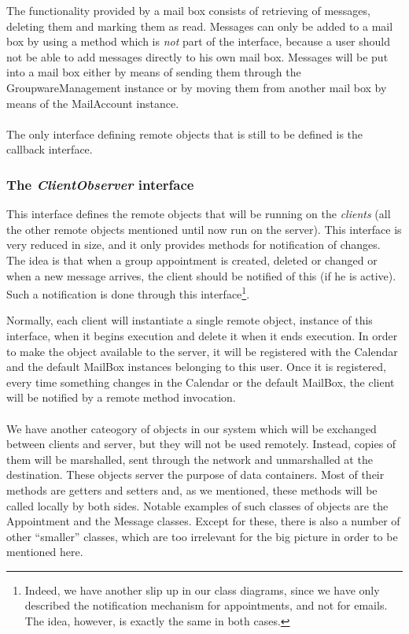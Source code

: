 \documentclass[a4paper,10pt]{article}
\begin{document}
The functionality provided by a mail box consists of retrieving of messages, deleting them
and marking them as read. Messages can only be added to a mail box by using a method
which is \emph{not} part of the interface, because a user should not be able to add messages
directly to his own mail box. Messages will be put into a mail box either by means of sending
them through the GroupwareManagement instance or by moving them from another mail
box by means of the MailAccount instance.\\
\\
The only interface defining remote objects that is still to be defined is the callback interface.

\subsubsection*{The \emph{ClientObserver} interface}

This interface defines the remote objects that will be running on the \emph{clients} (all
the other remote objects mentioned until now run on the server). This interface is very
reduced in size, and it only provides methods for notification of changes. The idea is that
when a group appointment is created, deleted or changed or when a new message arrives,
the client should be notified of this (if he is active). Such a notification is done through
this interface\footnote{Indeed, we have another slip up in our class diagrams, since we
have only described the notification mechanism for appointments, and not for emails.
The idea, however, is exactly the same in both cases.}.

Normally, each client will instantiate a single remote object, instance of this interface,
when it begins execution and delete it when it ends execution. In order to make the object
available to the server, it will be registered with the Calendar and the default MailBox
instances belonging to this user. Once it is registered, every time something changes
in the Calendar or the default MailBox, the client will be notified by a remote method
invocation.\\
\\
We have another cateogory of objects in our system which will be exchanged between clients
and server, but they will not be used remotely. Instead, copies of them will be marshalled,
sent through the network and unmarshalled at the destination. These objects server the
purpose of data containers. Most of their methods are getters and setters and, as we
mentioned, these methods will be called locally by both sides. Notable examples of such
classes of objects are the Appointment and the Message classes. Except for these, there
is also a number of other ``smaller'' classes, which are too irrelevant for the big picture
in order to be mentioned here.
\end{document}
